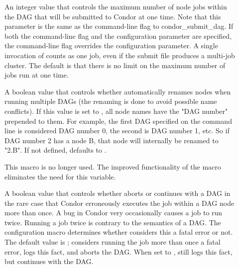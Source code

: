 \begin{description}
\item[]
\label{param:DAGManMaxJobsSubmitted}
An integer value that controls the maximum number of node jobs within the
DAG that will  be submitted to Condor at one time.  Note that this
parameter is the same as the  command-line flag
to condor\_submit\_dag.  If both the command-line flag and the
configuration parameter are specified, the command-line flag overrides
the configuration parameter.  A single invocation of 
counts as one job, even if the submit file produces a multi-job cluster.
The default is that there is no limit on the maximum number of jobs
run at one time.

\item[]
\label{param:DAGManMungeNodeNames}
A boolean value that controls whether  automatically
renames nodes when running multiple DAGs (the renaming is done to
avoid possible name conflicts).  If this value is set to ,
all node names have the "DAG number" prepended to them.  For example,
the first DAG specified on the  command line is
considered DAG number 0, the second is DAG number 1, etc.  So if
DAG number 2 has a node B, that node will internally be renamed
to "2.B".
If not defined,  defaults to .


\item[]
\label{param:DAGManIgnoreDuplicateJobExecution}
This macro is no longer used. The improved functionality
of the  macro eliminates the
need for this variable.

A boolean value that controls
whether  aborts or continues with a DAG
in the rare case that Condor erroneously executes
the job within a DAG node more than once.
A bug in Condor very occasionally causes a job to run twice.
Running a job twice is contrary to the semantics of a DAG.
The configuration macro 
determines whether   considers this a fatal error or not.
The default value is ;  considers
running the job more than once a fatal error, 
logs this fact,
and aborts the DAG.
When set to ,  still
logs this fact,
but continues with the DAG. 


\end{description}
